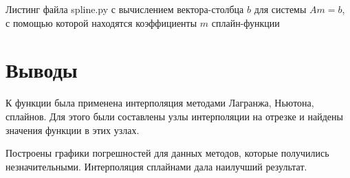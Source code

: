 Листинг файла spline.py с вычислением вектора-столбца $b$ для системы $Am = b$,
с помощью которой находятся коэффициенты $m$ сплайн-функции
\lstset{inputencoding=utf8, extendedchars=\true}



\chapter*{Выводы}

К функции была применена интерполяция методами Лагранжа, Ньютона, сплайнов.
Для этого были составлены узлы интерполяции на отрезке и найдены значения функции в этих узлах.

Построены графики погрешностей для данных методов, которые получились незначительными.
Интерполяция сплайнами дала наилучший результат.


